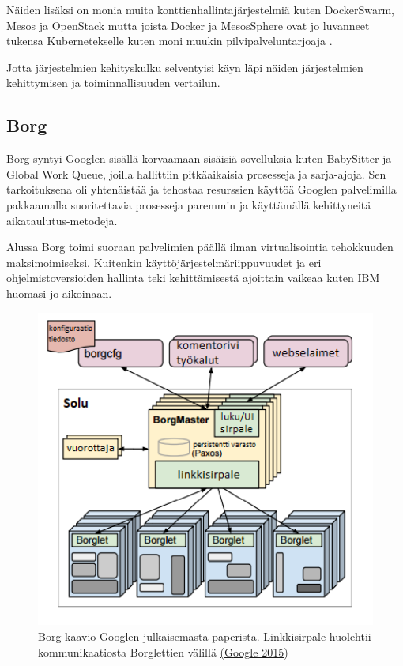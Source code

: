 \documentclass[finnish,gradu]{tktltiki3}
\begin{document}
    Näiden lisäksi on monia muita konttienhallintajärjestelmiä kuten DockerSwarm, Mesos ja OpenStack mutta joista Docker ja MesosSphere ovat jo luvanneet tukensa Kubernetekselle kuten moni muukin pilvipalveluntarjoaja \cite{practical-container}.
    
    Jotta järjestelmien kehityskulku selventyisi käyn läpi näiden järjestelmien kehittymisen ja toiminnallisuuden vertailun.
    
    \subsection{Borg}
    
    Borg syntyi Googlen sisällä korvaamaan sisäisiä sovelluksia kuten BabySitter ja Global Work Queue, joilla hallittiin pitkäaikaisia prosesseja ja sarja-ajoja. Sen tarkoituksena oli yhtenäistää ja tehostaa resurssien käyttöä Googlen palvelimilla pakkaamalla suoritettavia prosesseja paremmin ja käyttämällä kehittyneitä aikataulutus-metodeja.
    
    Alussa Borg toimi suoraan palvelimien päällä ilman virtualisointia tehokkuuden maksimoimiseksi. Kuitenkin käyttöjärjestelmäriippuvuudet ja eri ohjelmistoversioiden hallinta teki kehittämisestä ajoittain vaikeaa kuten IBM huomasi jo aikoinaan.
    
    \begin{figure}[h]
        \centering
        \includegraphics[width=1\textwidth]{images/borg.png}
        \caption{Borg kaavio Googlen julkaisemasta paperista. Linkkisirpale huolehtii kommunikaatiosta Borglettien välillä \href{https://ai.google/research/pubs/pub43438}{(Google 2015)}}
        \label{fig:borg}
    \end{figure}
    
\end{document}
